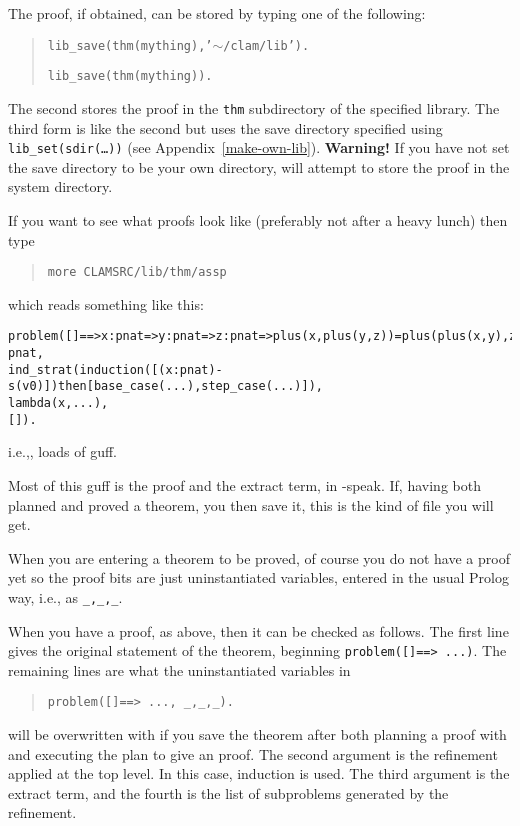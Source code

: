 \documentclass{article}
\begin{document}
The \oyster proof, if obtained, can be stored by typing one of the
following:
%
\begin{verse}
{\tt lib\_save(thm(mything),'$\sim$/clam/lib').}

{\tt lib\_save(thm(mything)).}
\end{verse}
%
The second stores the proof in the
{\tt thm} subdirectory of the specified \clam library. The third form is
like the second but uses the save directory specified using
{\tt lib\_set(sdir(\ldots))} (see Appendix~\ref{make-own-lib}).
{\bf Warning!}
If you have not set the save directory to be your own directory, \clam
will attempt to store the proof in the system directory.

If you want to see what \oyster proofs look like (preferably not
after a heavy lunch) then type
%
\begin{verse}
{\tt more CLAMSRC/lib/thm/assp}
\end{verse}
%
which reads something like this:
%
\begin{verbatim}
problem([]==>x:pnat=>y:pnat=>z:pnat=>plus(x,plus(y,z))=plus(plus(x,y),z)in pnat,
ind_strat(induction([(x:pnat)-s(v0)])then[base_case(...),step_case(...)]),
lambda(x,...),
[]).
\end{verbatim}
%
i.e.,, loads of guff.

Most of this guff is the proof and the extract term, in \oyster-speak.
If, having both planned and proved a theorem, you then save it, this is the
kind of file you will get.

When you are entering a theorem to be proved, of course you do not have
a proof yet so the proof bits are just uninstantiated variables, entered
in the usual Prolog way, i.e., as {\tt \_,\_,\_}.

When you have a proof, as above, then it can be checked as follows. The first
line gives the original statement of the theorem, beginning
{\tt problem([]==> ...)}. The remaining lines are what the uninstantiated
variables in
%
\begin{verse}
{\tt problem([]==> ..., \_,\_,\_).}
\end{verse}
%
will be overwritten with if you save the theorem after both planning a proof
with \clam and executing the plan to give an \oyster proof. The
second argument is the refinement applied at the top level. In this case,
induction is used. The third argument is the extract term, and the fourth is
the list of subproblems generated by the refinement.


\nocite{tp4}
\nocite{pub413}
\nocite{pub567}



\end{document}
